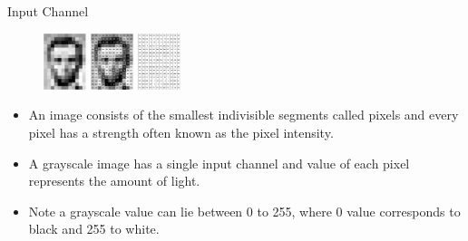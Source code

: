 \begin{vbframe}{Input Channel}
         \begin{figure}
    \centering
    \includegraphics[width=4cm]{figure/gray.png}
  \end{figure}
    \begin{itemize}
    
       \item An image consists of the smallest indivisible segments called pixels and every pixel has a strength often known as the pixel intensity. 
       
       \item A grayscale image has a single input channel and value of each pixel represents the amount of light.
       
       \item Note a grayscale value can lie between 0 to 255, where 0 value corresponds to black and 255 to white.
       
       
    \end{itemize}

\end{vbframe}

